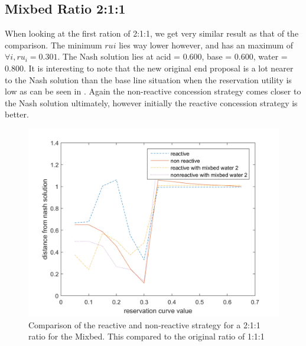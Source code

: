 \subsection{Mixbed Ratio 2:1:1}
When looking at the first ration of 2:1:1, we get very similar result as that of the comparison. The minimum $rui$ lies way lower however, and has an maximum of $\forall i, ru_i = 0.301$. The Nash solution lies at acid = 0.600, base = 0.600, water = 0.800.
It is interesting to note that the new original end proposal is a lot nearer to the Nash solution than the base line situation when the reservation utility is low as can be seen in . Again the non-reactive concession strategy comes closer to the Nash solution ultimately, however initially the reactive concession strategy is better. 
\begin{figure}[h]
	\centering
	\includegraphics[width=0.7\linewidth]{img/reactivevsnonreactiveMixbed2.png}
	\caption{Comparison of the reactive and non-reactive strategy for a 2:1:1 ratio for the Mixbed. This compared to the original ratio of 1:1:1}
	\label{fig:reactivevsnon-reactiveMixbed2}
\end{figure}


